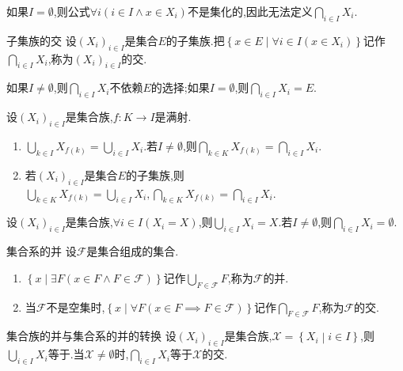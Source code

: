 \begin{remark}{}{}
	如果$I=\emptyset$,则公式$\forall i\left(i\in I\wedge x\in X_{i}\right)$不是集化的,因此无法定义$\bigcap\limits_{i\in I}X_{i}$.
\end{remark}

\begin{definition}{子集族的交}{}
	设$\left(X_{i}\right)_{i\in I}$是集合$E$的子集族.把$\left\{x\in E\middle|\forall i\in I\left(x\in X_{i}\right)\right\}$记作$\bigcap\limits_{i\in I}X_{i}$,称为$\left(X_{i}\right)_{i\in I}$的交.
\end{definition}

\begin{remark}{}{}
	如果$I\neq\emptyset$,则$\bigcap\limits_{i\in I}X_{i}$不依赖$E$的选择;如果$I=\emptyset$,则$\bigcap\limits_{i\in I}X_{i}=E$.
\end{remark}

\begin{proposition}{}{}
	设$\left(X_{i}\right)_{i\in I}$是集合族,$f:K\to I$是满射.
	\begin{enumerate}
		\item $\bigcup\limits_{k\in I}X_{f\left(k\right)}=\bigcup\limits_{i\in I}X_{i}$.若$I\neq\emptyset$,则$\bigcap\limits_{k\in K}X_{f\left(k\right)}=\bigcap\limits_{i\in I}X_{i}$.
		\item 若$\left(X_{i}\right)_{i\in I}$是集合$E$的子集族,则$\bigcup\limits_{k\in K}X_{f\left(k\right)}=\bigcup\limits_{i\in I}X_{i},\bigcap\limits_{k\in K}X_{f\left(k\right)}=\bigcap\limits_{i\in I}X_{i}$.
	\end{enumerate}
\end{proposition}

\begin{corollary}{}{}
	设$\left(X_{i}\right)_{i\in I}$是集合族,$\forall i\in I\left(X_{i}=X\right)$,则$\bigcup\limits_{i\in I}X_{i}=X$.若$I\neq\emptyset$,则$\bigcap\limits_{i\in I}X_{i}=\emptyset$.
\end{corollary}

\begin{definition}{集合系的并}{}
	设$\mathcal{F}$是集合组成的集合.
	\begin{enumerate}
		\item $\left\{x\middle|\exists F\left(x\in F\wedge F\in\mathcal{F}\right)\right\}$记作$\bigcup\limits_{F\in\mathcal{F}}F$,称为$\mathcal{F}$的并.
		\item  当$\mathcal{F}$不是空集时,$\left\{x\middle|\forall F\left(x\in F\implies F\in\mathcal{F}\right)\right\}$记作$\bigcap\limits_{F\in\mathcal{F}}F$,称为$\mathcal{F}$的交.
	\end{enumerate}
\end{definition}

\begin{proposition}{集合族的并与集合系的并的转换}{}
	设$\left(X_{i}\right)_{i\in I}$是集合族,$\mathcal{X}=\left\{X_{i}\middle|i\in I\right\}$,则$\bigcup\limits_{i\in I}X_{i}$等于.当$\mathcal{X}\neq\emptyset$时,$\bigcap\limits_{i\in I}X_{i}$等于$\mathcal{X}$的交.
\end{proposition}






